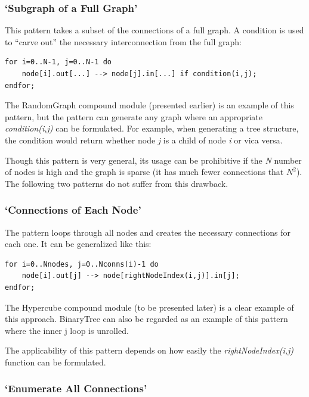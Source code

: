 \subsubsection{`Subgraph of a Full Graph'}


This pattern takes a subset of the connections of a full graph.  A
condition is used to ``carve out'' the necessary interconnection from
the full graph:

\begin{Verbatim}[commandchars=\\\{\}]
for i=0..N-1, j=0..N-1 do
    node[i].out[...] --> node[j].in[...] if condition(i,j);
endfor;
\end{Verbatim}

The RandomGraph compound module (presented earlier) is an example of
this pattern, but the pattern can generate any graph where an
appropriate \textit{condition(i,j)} can be formulated. For example,
when generating a tree structure, the condition
would return whether node \textit{j} is a child of node \textit{i} or
vica versa.

Though this pattern is very general, its usage can be prohibitive if
the \textit{N} number of nodes is high and the graph is sparse (it has
much fewer connections that $N^2$). The following
two patterns do not suffer from this drawback.


\subsubsection{`Connections of Each Node'}

The pattern loops through all nodes and creates the necessary
connections for each one. It can be generalized like this:

\begin{Verbatim}[commandchars=\\\{\}]
for i=0..Nnodes, j=0..Nconns(i)-1 do
    node[i].out[j] --> node[rightNodeIndex(i,j)].in[j];
endfor;
\end{Verbatim}

The Hypercube compound module (to be
presented later) is a clear example of this approach. BinaryTree can
also be regarded as an example of this pattern where the inner j loop
is unrolled.

The applicability of this pattern depends on how easily the \textit{rightNodeIndex(i,j)}
function can be formulated.


\subsubsection{`Enumerate All Connections'}



